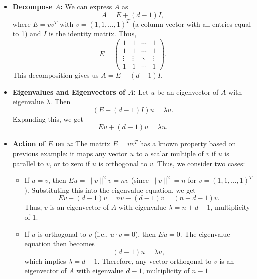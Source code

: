 \documentclass{article}
\begin{document}
\begin{itemize}
    \item \textbf{Decompose \( A \):} We can express \( A \) as
          \[
              A = E + (d-1) I,
          \]
          where \( E = v v^T \) with \( v = (1, 1, \dots, 1)^T \) (a column vector with all entries equal to 1) and \( I \) is the identity matrix. Thus,
          \[
              E = \left( \begin{array}{cccc}
                      1      & 1      & \cdots & 1      \\
                      1      & 1      & \cdots & 1      \\
                      \vdots & \vdots & \ddots & \vdots \\
                      1      & 1      & \cdots & 1
                  \end{array} \right).
          \]
          This decomposition gives us \( A = E + (d-1) I \).

    \item \textbf{Eigenvalues and Eigenvectors of \( A \):} Let \( u \) be an eigenvector of \( A \) with eigenvalue \( \lambda \). Then
          \[
              (E + (d-1) I) u = \lambda u.
          \]
          Expanding this, we get
          \[
              E u + (d-1) u = \lambda u.
          \]

    \item \textbf{Action of \( E \) on \( u \):} The matrix \( E = v v^T \) has a known property based on previous example: it maps any vector \( u \) to a scalar multiple of \( v \) if \( u \) is parallel to \( v \), or to zero if \( u \) is orthogonal to \( v \). Thus, we consider two cases:

          \begin{itemize}
              \item If \( u = v \), then \( E u = \| v \|^2 v = n v \) (since \( \| v \|^2 = n \) for \( v = (1, 1, \dots, 1)^T \)). Substituting this into the eigenvalue equation, we get
                    \[
                        E v + (d-1) v = n v + (d-1) v = (n + d - 1) v.
                    \]
                    Thus, \( v \) is an eigenvector of \( A \) with eigenvalue \( \lambda = n + d - 1 \), multiplicity of 1.

              \item If \( u \) is orthogonal to \( v \) (i.e., \( u \cdot v = 0 \)), then \( E u = 0 \). The eigenvalue equation then becomes
                    \[
                        (d-1) u = \lambda u,
                    \]
                    which implies \( \lambda = d - 1 \). Therefore, any vector orthogonal to \( v \) is an eigenvector of \( A \) with eigenvalue \( d - 1 \), multiplicity of $n-1$
          \end{itemize}
\end{itemize}
\end{document}
